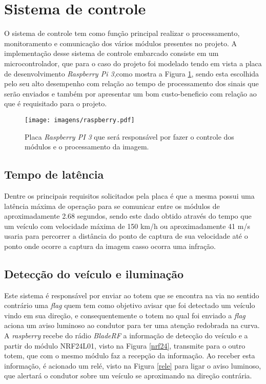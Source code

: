         
\section{Sistema de controle}
    O sistema de controle tem como função principal realizar o processamento, monitoramento e comunicação dos vários módulos presentes no projeto. A implementação desse sistema de controle embarcado consiste em um microcontrolador, que para o caso do projeto foi modelado tendo em vista a placa de desenvolvimento \emph{Raspberry Pi 3},como mostra a Figura \ref{raspberry}, sendo esta escolhida pelo seu alto desempenho com relação ao tempo de processamento dos sinais que serão enviados e também por apresentar um bom custo-beneficio com relação ao que é requisitado para o projeto. 
    
    \begin{figure}[H]
    \centering
   \texttt{[image: imagens/raspberry.pdf]}
   \caption{Placa \emph{Raspberry PI 3} que será responsável por fazer o controle dos módulos e o processamento da imagem.}
   \label{raspberry}
    \end{figure}
    
    
    \subsection{Tempo de latência}
    Dentre os principais requisitos solicitados pela placa é que a mesma possui uma latência máxima de operação para se comunicar entre os módulos de aproximadamente 2.68 segundos, sendo este dado obtido através do tempo que um veículo com velocidade máxima de 150 km/h ou aproximadamente 41 m/s usaria para percorrer a distância do ponto de captura de sua velocidade até o ponto onde ocorre a captura da imagem casso ocorra uma infração. 
    
    \subsection{Detecção do veículo e iluminação}
    Este sistema é responsável por enviar ao totem que se encontra na via no sentido contrário uma \emph{flag} quem tem como objetivo avisar que foi detectado um veículo vindo em sua direção, e consequentemente o totem no qual foi enviado a \emph{flag} aciona um aviso luminoso ao condutor para ter uma atenção redobrada na curva. A \emph{raspberry} recebe do rádio \emph{BladeRF} a informação de detecção do veículo e a partir do módulo NRF24L01, visto na Figura \ref{nrf24}, transmite para o outro totem, que com o mesmo módulo faz a recepção da informação. Ao receber esta informação, é acionado um relé, visto na Figura \ref{rele} para ligar o aviso luminoso, que alertará o condutor sobre um veículo se aproximando na direção contrária.
    
